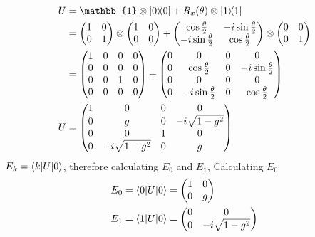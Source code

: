 \begin{align}
    U &= \mathbb{1} \otimes \ketbra{0} + R_x(\theta) \otimes \ketbra{1} \\
    &= \begin{pmatrix}1 & 0 \\ 0 & 1 \end{pmatrix} \otimes \begin{pmatrix}1 & 0 \\ 0 & 0 \end{pmatrix} + \begin{pmatrix} \cos\frac{\theta}{2} & -i\sin\frac{\theta}{2} \\ -i\sin\frac{\theta}{2} & \cos\frac{\theta}{2} \end{pmatrix} \otimes \begin{pmatrix}0 & 0 \\ 0 & 1 \end{pmatrix} \\
    &= \begin{pmatrix} 1 & 0 & 0 & 0 \\ 0 & 0 & 0 & 0 \\ 0 & 0 & 1 & 0 \\ 0 & 0 & 0 & 0 \end{pmatrix} + 
    \begin{pmatrix} 0 & 0 & 0 & 0 \\ 0 & \cos\frac{\theta}{2} & 0 & -i\sin\frac{\theta}{2} \\ 0 & 0 & 0 & 0 \\ 0 & -i\sin\frac{\theta}{2} & 0 & \cos\frac{\theta}{2} \end{pmatrix} \\
    U &= \begin{pmatrix} 1 & 0 & 0 & 0 \\ 0 & g & 0 & -i\sqrt{1-g^2} \\ 0 & 0 & 1 & 0 \\ 0 & -i\sqrt{1-g^2} & 0 & g \end{pmatrix}
\end{align}
$E_k = \braket{k|U|0}$, therefore calculating $E_0$ and $E_1$, 
Calculating $E_0$
\begin{align}
    E_0 &= \braket{0|U|0} = \begin{pmatrix}1 & 0 \\ 0 & g\end{pmatrix} \\
    E_1 &= \braket{1|U|0} = \begin{pmatrix}0 & 0 \\ 0 & -i\sqrt{1-g^2}\end{pmatrix}
\end{align}



